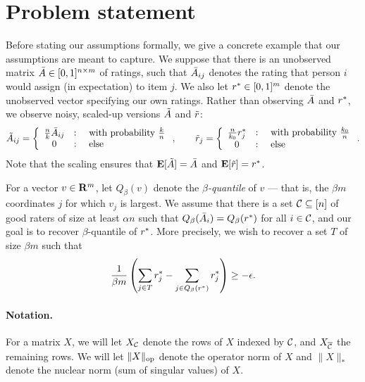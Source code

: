 \section{Problem statement}
\label{sec:assumptions}

Before stating our assumptions formally, we give a concrete example that our 
assumptions are meant to capture. 
We suppose that there is an unobserved matrix $\bar{A} \in [0,1]^{n \times m}$
of ratings, such that $\bar{A}_{ij}$ denotes the rating that person $i$ would 
assign (in expectation) to item $j$. 
We also let $r^* \in [0,1]^m$ denote the unobserved vector 
specifying our own ratings. Rather than observing $\bar{A}$ and $r^*$, 
we observe noisy, scaled-up versions $\tilde{A}$ and $\tilde{r}$:
\begin{equation}
\label{eq:sampling}
\tilde{A}_{ij} = \left\{ \begin{array}{ccl} \frac{n}{k}\bar{A}_{ij} & : & \text{ with probability $\frac{k}{n}$} \\ 0 & : & \text{ else} \end{array} \right., \quad\quad 
  \tilde{r}_j = \left\{ \begin{array}{ccl} \frac{n}{k_0}r^*_j & : & \text{ with probability $\frac{k_0}{n}$} \\ 0 & : & \text{ else} \end{array} \right..
\end{equation} %
Note that the scaling ensures that $\mathbf{E}[\tilde{A}] = \bar{A}$ and $\mathbf{E}[\tilde{r}] = r^*$. 

For a vector $v \in \mathbf{R}^m$, let $Q_{\beta}(v)$ denote the \emph{$\beta$-quantile} 
of $v$ --- that is, the $\beta m$ coordinates $j$ for which $v_j$ is largest.
We assume that there is a set $\mathcal{C} \subseteq [n]$ of good raters of size 
at least $\alpha n$ such 
that $Q_{\beta}(\bar{A}_{i}) = Q_{\beta}(r^*)$ for all $i \in \mathcal{C}$, and our 
goal is to recover $\beta$-quantile of $r^*$. More precisely, we wish to 
recover a set $T$ of size $\beta m$ such that
\[ \frac{1}{\beta m}\left( \sum_{j \in T} r^*_j - \sum_{j \in Q_{\beta}(r^*)} r^*_j \right) \geq - \epsilon. \]

\paragraph{Notation.}
For a matrix $X$, we will let $X_{\mathcal{C}}$ denote the rows of 
$X$ indexed by $\mathcal{C}$, and $X_{\overline{\mathcal{C}}}$ the remaining rows. 
We will let $\|X\|_{\mathrm{op}}$ denote the operator norm of $X$ and 
$\|X\|_*$ denote the nuclear norm (sum of singular values) of $X$.

